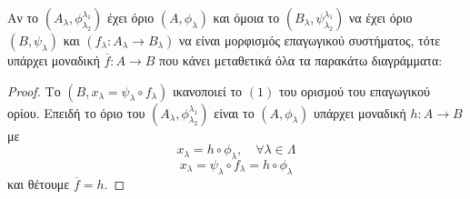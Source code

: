 \begin{prop}
    Αν το $(A_{\lambda},\phi^{\lambda_1}_{\lambda_2})$ έχει όριο $(A,\phi_{\lambda})$ και όμοια το $(B_{\lambda},\psi^{\lambda_1}_{\lambda_2})$ να έχει όριο $(B,\psi_{\lambda})$ και $(f_{\lambda}:A_{\lambda}\rightarrow B_{\lambda})$ να είναι μορφισμός επαγωγικού συστήματος, τότε υπάρχει μοναδική $\overline{f} : A \rightarrow B$ που κάνει μεταθετικά όλα τα παρακάτω διαγράμματα:

    \begin{figure}[H]
        \centering
    \end{figure}
    
    \begin{figure}[H]
        \centering
    \end{figure}
\end{prop}
\begin{proof}
    \noindent Το $(B,x_{\lambda} = \psi_{\lambda}\circ f_{\lambda})$ ικανοποιεί το $(1)$ του ορισμού του επαγωγικού ορίου. Επειδή το όριο του $(A_{\lambda}, \phi^{\lambda_1}_{\lambda_2})$ είναι το $(A,\phi_{\lambda})$ υπάρχει μοναδική $h:A\rightarrow B$ με 
    $$x_{\lambda} = h \circ \phi_{\lambda}, \quad \forall \lambda \in \Lambda$$
    $$x_{\lambda} = \psi_{\lambda} \circ f_{\lambda} = h \circ \phi_{\lambda}$$ και θέτουμε $\overline{f} = h$.

\end{proof}



